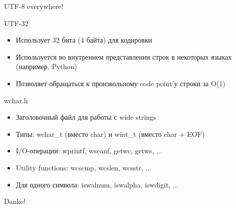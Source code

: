 \documentclass[10pt,pdf,hyperref={unicode}]{beamer}
\begin{document}
\begin{frame}{UTF-8 everywhere!}
\center{}
\end{frame}

\begin{frame}{UTF-32}
\begin{itemize}
    \item Использует 32 бита (4 байта) для кодировки
    \item Используется во внутреннем представлении строк в некоторых языках (например, Python)
    \item Позволяет обращаться к произвольному code point'у строки за O(1)
\end{itemize}
\end{frame}


\begin{frame}{wchar.h}
\begin{itemize}
    \item Заголовочный файл для работы с wide strings
    \item Типы: wchar\_t (вместо char) и wint\_t (вместо char + EOF)
    \item I/O-операции: wprintf, wscanf, getwc, getws, ...
    \item Utility functions: wcscmp, wcslen, wcsstr, ...
    \item Для одного символа: iswalnum, iswalpha, iswdigit, ...
\end{itemize}
\end{frame}


\begin{frame}
\center\Huge{Danke!}
\end{frame}
\end{document}
